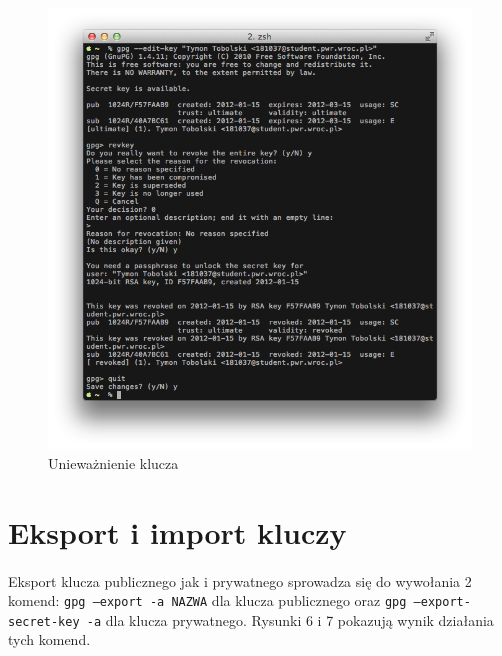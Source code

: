\documentclass[wide,a4paper,titlepage,12pt] {article}
\begin{document}
  \begin{figure}[h!]
    \begin{center}
      \includegraphics[width=\textwidth]{img/5.png}
      \caption{Unieważnienie klucza}
    \end{center}
  \end{figure}

  \newpage
  \section{Eksport i import kluczy}
  \paragraph{}
  Eksport klucza publicznego jak i prywatnego sprowadza się do wywołania 2 komend: \texttt{gpg --export -a NAZWA} dla klucza publicznego oraz \texttt{gpg --export-secret-key -a} dla klucza prywatnego. Rysunki 6 i 7 pokazują wynik działania tych komend.
\end{document}
